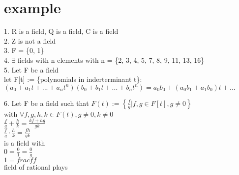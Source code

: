 \documentclass[11pt]{article}
\begin{document}
\section{example}

1. R is a field, Q is a field, C is a field\\

2. Z is not a field\\

3. F = \{0, 1\}\\

4. $\exists$ fields with n elements with n = \{2, 3, 4, 5, 7, 8, 9, 11, 13, 16\}\\

5. Let F be a field \\
let F[t] := \{polynomials in inderterminant t\}:\\
$(a_0+a_1t+...+a_nt^n)(b_0+b_1t+...+b_nt^n) = a_0b_0+(a_0b_1+a_1b_0)t+...$

6. Let F be a field such that $F(t) := \left\{\frac{f}{g}| f,g\in F[t], g\neq 0\right\}$\\
with $\forall f,g,h,k \in F(t), g \neq 0, k \neq 0$\\
$\frac{f}{g}+\frac{h}{k}=\frac{kf+hg}{gk}$\\
$\frac{f}{g}\cdot \frac{h}{k}=\frac{fh}{gk}$\\
is a field with\\
$0=\frac{0}{1}=\frac{0}{g}$\\
$1=frac{f}{f}$\\
field of rational plays\\
\end{document}
